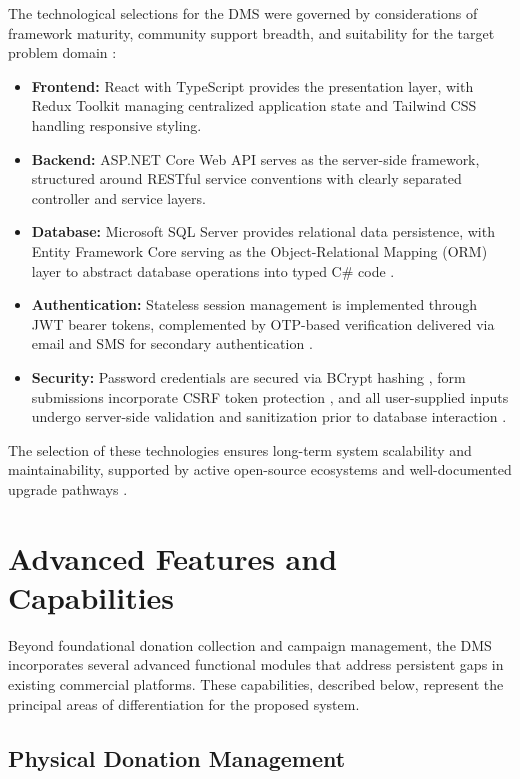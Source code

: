 \documentclass{thesis-library}
\begin{document}
The technological selections for the DMS were governed by considerations of framework maturity, community support breadth, and suitability for the target problem domain \cite{jones2023modern}:
\begin{itemize}
    \item \textbf{Frontend:} React with TypeScript \cite{freeman2021react,cherny2019programming,banks2017learning} provides the presentation layer, with Redux Toolkit managing centralized application state and Tailwind CSS handling responsive styling.
    \item \textbf{Backend:} ASP.NET Core Web API serves as the server-side framework, structured around RESTful service conventions with clearly separated controller and service layers.
    \item \textbf{Database:} Microsoft SQL Server provides relational data persistence, with Entity Framework Core serving as the Object-Relational Mapping (ORM) layer to abstract database operations into typed C\# code \cite{lerman2020efcore,coronel2016database}.
    \item \textbf{Authentication:} Stateless session management is implemented through JWT bearer tokens, complemented by OTP-based verification delivered via email and SMS for secondary authentication \cite{suoranta2019otp,jones2015jwt}.
    \item \textbf{Security:} Password credentials are secured via BCrypt hashing \cite{provos1999bcrypt}, form submissions incorporate CSRF token protection \cite{barth2008robust}, and all user-supplied inputs undergo server-side validation and sanitization prior to database interaction \cite{owasp2021top10}.
\end{itemize}
The selection of these technologies ensures long-term system scalability and maintainability, supported by active open-source ecosystems and well-documented upgrade pathways \cite{smith2020tech}.

\section{Advanced Features and Capabilities}

Beyond foundational donation collection and campaign management, the DMS incorporates several advanced functional modules that address persistent gaps in existing commercial platforms. These capabilities, described below, represent the principal areas of differentiation for the proposed system.

\subsection{Physical Donation Management}
\end{document}
